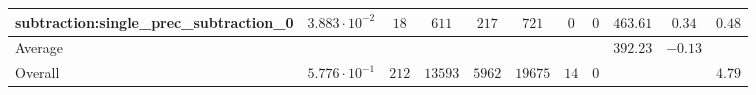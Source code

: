 \begin{tabular}{|l|c|c|c|c|c|c|c|c|c|c|}
subtraction:single\_prec\_subtraction\_0         & $ 3.883 \cdot 10^{-2} $ & $ 18     $ & $ 611   $ & $ 217  $ & $ 721   $ & $ 0  $ & $ 0 $ & $ 463.61      $ & $ 0.34    $ & $ 0.48    $ \\
\hline
Average                                          & $                     $ & $        $ & $       $ & $      $ & $       $ & $    $ & $   $ & $ 392.23      $ & $ -0.13   $ & $         $ \\
\hline
Overall                                          & $ 5.776 \cdot 10^{-1} $ & $ 212    $ & $ 13593 $ & $ 5962 $ & $ 19675 $ & $ 14 $ & $ 0 $ & $             $ & $         $ & $ 4.79    $ \\
\hline
\end{tabular}
